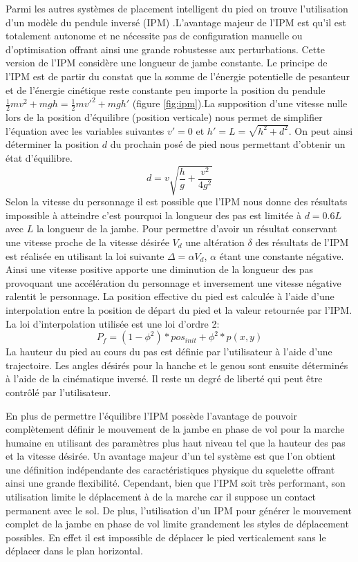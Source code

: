 \documentclass[runningheads,a4paper]{llncs}
\begin{document}
Parmi les autres systèmes de placement intelligent du pied on trouve l'utilisation d'un modèle du pendule inversé (IPM) \cite{coros2010generalized,kajita20013d}.L'avantage majeur de l'IPM est qu'il est totalement autonome et ne nécessite pas de configuration manuelle ou d'optimisation offrant ainsi une grande robustesse aux perturbations. Cette version de l'IPM considère une longueur de jambe constante. Le principe de l'IPM est de partir du constat que la somme de l'énergie potentielle de pesanteur et de l'énergie cinétique reste constante peu importe la position du pendule  $\frac{1}{2}mv^2+mgh=\frac{1}{2}mv'^2+mgh'$ (figure \ref{fig:ipm}).La supposition d'une vitesse nulle lors de la position d'équilibre (position verticale) nous permet de simplifier l'équation avec les variables suivantes \(v'=0\) et \(h'=L=\sqrt{h^2+d^2}\). On peut ainsi déterminer la position \(d\) du prochain posé de pied nous permettant d'obtenir un état d'équilibre.
\[
d=v\sqrt{\frac{h}{g}+\frac{v^2}{4g^2}}
\]
Selon la vitesse du personnage il est possible que l'IPM nous donne des résultats impossible à atteindre c'est pourquoi la longueur des pas est limitée à \(d=0.6L\) avec \(L\) la longueur de la jambe.
Pour permettre d'avoir un résultat conservant une vitesse proche de la vitesse désirée \(V_d\) une altération $\delta$ des résultats de l'IPM est réalisée en utilisant la loi suivante \(\Delta=\alpha V_d\), $\alpha$ étant une constante négative. Ainsi une vitesse positive apporte une diminution de la longueur des pas provoquant une accélération du personnage et inversement une vitesse négative ralentit le personnage.
La position effective du pied est calculée à l'aide d'une interpolation entre la position de départ du pied et la valeur retournée par l'IPM. La loi d'interpolation utilisée est une loi d'ordre 2:
\[
P_f=(1-\phi^2)*pos_{init}+\phi^2*p(x,y)
\]
La hauteur du pied au cours du pas est définie par l'utilisateur à l'aide d'une trajectoire.
Les angles désirés pour la hanche et le genou sont ensuite déterminés à l'aide de la cinématique inversé. Il reste un degré de liberté qui peut être contrôlé par l'utilisateur.

En plus de permettre l'équilibre l'IPM possède l'avantage de pouvoir complètement définir le mouvement de la jambe en phase de vol pour la marche humaine en utilisant des paramètres plus haut niveau tel que la hauteur des pas et la vitesse désirée. Un avantage majeur d'un tel système est que l'on obtient une définition indépendante des caractéristiques physique du squelette offrant ainsi une grande flexibilité. Cependant, bien que l'IPM soit très performant, son utilisation limite le déplacement à de la marche car il suppose un contact permanent avec le sol. De plus, l'utilisation d'un IPM pour générer le mouvement complet de la jambe en phase de vol limite grandement les styles de déplacement possibles. En effet il est impossible de déplacer le pied verticalement sans le déplacer dans le plan horizontal.
\end{document}
